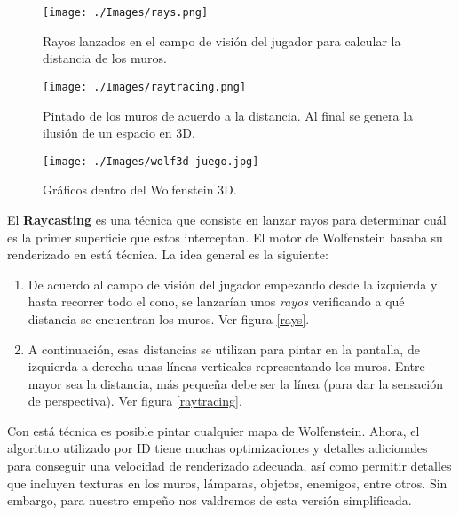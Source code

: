 \begin{wrapfigure}{r}{0.4\textwidth}
	\begin{center}
		\texttt{[image: ./Images/rays.png]}
	\end{center}	
	\caption{Rayos lanzados en el campo de visión del jugador para calcular la distancia de los muros. \newline}
	\label{rays}
	
	\begin{center}
		\texttt{[image: ./Images/raytracing.png]}
	\end{center}	
	\caption{Pintado de los muros de acuerdo a la distancia. Al final se genera la ilusión de un espacio en 3D. \newline}
	\label{raytracing}
	
	\begin{center}
		\texttt{[image: ./Images/wolf3d-juego.jpg]}
	\end{center}
	\caption{Gráficos dentro del Wolfenstein 3D.}
	\label{wolf3d-mapa}

\end{wrapfigure}

El \textbf{Raycasting} es una técnica que consiste en lanzar rayos para determinar cuál es la primer superficie que estos interceptan. El motor de Wolfenstein basaba su renderizado en está técnica. La idea general es la siguiente:

\begin{enumerate}
	\item De acuerdo al campo de visión del jugador empezando desde la izquierda y hasta recorrer todo el cono, se lanzarían unos \emph{rayos} verificando a qué distancia se encuentran los muros. Ver figura \ref{rays}.
	
	\item A continuación, esas distancias se utilizan para pintar en la pantalla, de izquierda a derecha unas líneas verticales representando los muros. Entre mayor sea la distancia, más pequeña debe ser la línea (para dar la sensación de perspectiva). Ver figura \ref{raytracing}.
\end{enumerate}

Con está técnica es posible pintar cualquier mapa de Wolfenstein. Ahora, el algoritmo utilizado por ID tiene muchas optimizaciones y detalles adicionales para conseguir una velocidad de renderizado adecuada, así como permitir detalles que incluyen texturas en los muros, lámparas, objetos, enemigos, entre otros. Sin embargo, para nuestro empeño nos valdremos de esta versión simplificada.




